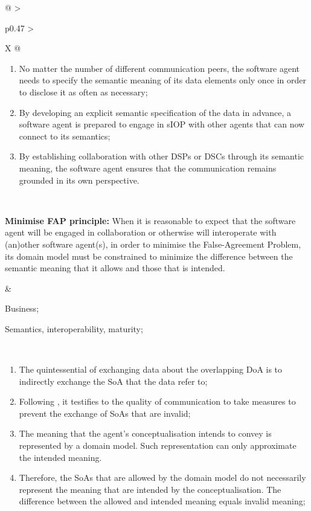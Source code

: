 \begin{xltabular}[l]{\linewidth}{@{} >{\small\raggedright\arraybackslash}p{0.47\linewidth} >{\small\raggedright\arraybackslash}X @{}}
\begin{enumerate}[left=10pt, nosep]
  \item No matter the number of different communication peers, the software agent needs to specify the semantic meaning of its data elements only once in order to disclose it as often as necessary;
  \item By developing an explicit semantic specification of the data in advance, a software agent is prepared to engage in sIOP with other agents that can now connect to its semantics;
  \item By establishing collaboration with other DSPs or DSCs through its semantic meaning, the software agent ensures that the communication remains grounded in its own perspective.
\end{enumerate} \\
%
%
%
\begin{mmdp}\label{dp:mfapp}{\bfseries Minimise FAP principle:}
\quad When it is reasonable to expect that the software agent will be engaged in collaboration or otherwise will interoperate with (an)other software agent(s), in order to minimise the False-Agreement Problem, its domain model must be constrained to minimize the difference between the semantic meaning that it allows and those that is intended.
\end{mmdp}
&
\begin{description}[labelwidth=3.7cm,leftmargin=3.7cm+1ex,nosep,topsep=2ex,labelsep=1ex,font=\bfseries]
  \item[Type of information:] Business;
  \item[Quality attributes:] Semantics, interoperability, maturity;
\end{description} \\
\begin{enumerate}[left=6pt, nosep]
  \item The quintessential of exchanging data about the overlapping DoA is to indirectly exchange the SoA that the data refer to;
  \item Following \cite{Grice:1991BT}, it testifies to the quality of communication to take measures to prevent the exchange of SoAs that are invalid;
  \item The meaning that the agent's conceptualisation intends to convey is represented by a domain model. Such representation can only approximate the intended meaning. 
  \item Therefore, the SoAs that are allowed by the domain model do not necessarily represent the meaning that are intended by the conceptualisation. The difference between the allowed and intended meaning equals invalid meaning;

\end{enumerate}
\end{xltabular}
